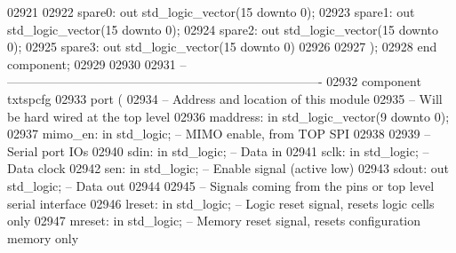 \begin{DoxyCode}
02921 
02922     spare0: \textcolor{keywordflow}{out} \textcolor{comment}{std\_logic\_vector}(\textcolor{vhdllogic}{}\textcolor{vhdllogic}{15} \textcolor{keywordflow}{downto} \textcolor{vhdllogic}{}\textcolor{vhdllogic}{0});
02923     spare1: \textcolor{keywordflow}{out} \textcolor{comment}{std\_logic\_vector}(\textcolor{vhdllogic}{}\textcolor{vhdllogic}{15} \textcolor{keywordflow}{downto} \textcolor{vhdllogic}{}\textcolor{vhdllogic}{0});
02924     spare2: \textcolor{keywordflow}{out} \textcolor{comment}{std\_logic\_vector}(\textcolor{vhdllogic}{}\textcolor{vhdllogic}{15} \textcolor{keywordflow}{downto} \textcolor{vhdllogic}{}\textcolor{vhdllogic}{0});
02925     spare3: \textcolor{keywordflow}{out} \textcolor{comment}{std\_logic\_vector}(\textcolor{vhdllogic}{}\textcolor{vhdllogic}{15} \textcolor{keywordflow}{downto} \textcolor{vhdllogic}{}\textcolor{vhdllogic}{0})
02926 
02927     );
02928 \textcolor{keywordflow}{end} \textcolor{keywordflow}{component};
02929 
02930 
02931 \textcolor{keyword}{-- ----------------------------------------------------------------------------}
02932 \textcolor{keywordflow}{component} txtspcfg 
02933     \textcolor{keywordflow}{port} (
02934 \textcolor{keyword}{        -- Address and location of this module}
02935 \textcolor{keyword}{        -- Will be hard wired at the top level}
02936         maddress: \textcolor{keywordflow}{in} \textcolor{comment}{std\_logic\_vector}(\textcolor{vhdllogic}{}\textcolor{vhdllogic}{9} \textcolor{keywordflow}{downto} \textcolor{vhdllogic}{}\textcolor{vhdllogic}{0});
02937         mimo_en: \textcolor{keywordflow}{in} \textcolor{comment}{std\_logic};  \textcolor{keyword}{-- MIMO enable, from TOP SPI}
02938     
02939 \textcolor{keyword}{        -- Serial port IOs}
02940         sdin: \textcolor{keywordflow}{in} \textcolor{comment}{std\_logic};     \textcolor{keyword}{-- Data in}
02941         sclk: \textcolor{keywordflow}{in} \textcolor{comment}{std\_logic};     \textcolor{keyword}{-- Data clock}
02942         sen: \textcolor{keywordflow}{in} \textcolor{comment}{std\_logic};  \textcolor{keyword}{-- Enable signal (active low)}
02943         sdout: \textcolor{keywordflow}{out} \textcolor{comment}{std\_logic};   \textcolor{keyword}{-- Data out}
02944     
02945 \textcolor{keyword}{        -- Signals coming from the pins or top level serial interface}
02946         lreset: \textcolor{keywordflow}{in} \textcolor{comment}{std\_logic};   \textcolor{keyword}{-- Logic reset signal, resets logic cells only}
02947         mreset: \textcolor{keywordflow}{in} \textcolor{comment}{std\_logic};   \textcolor{keyword}{-- Memory reset signal, resets configuration memory only}

\end{DoxyCode}
